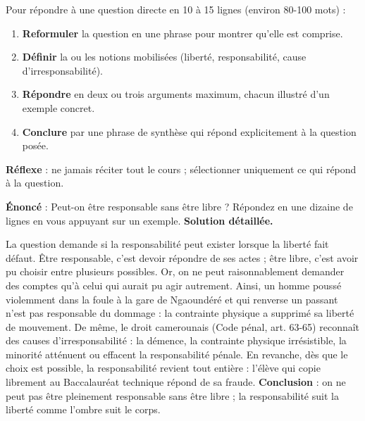\documentclass[11pt]{article}
\begin{document}
\begin{methode}
Pour répondre à une question directe en 10 à 15 lignes (environ 80-100 mots) :
\begin{enumerate}
\item \textbf{Reformuler} la question en une phrase pour montrer qu'elle est comprise.
\item \textbf{Définir} la ou les notions mobilisées (liberté, responsabilité, cause d'irresponsabilité).
\item \textbf{Répondre} en deux ou trois arguments maximum, chacun illustré d'un exemple concret.
\item \textbf{Conclure} par une phrase de synthèse qui répond explicitement à la question posée.
\end{enumerate}
\textbf{Réflexe} : ne jamais réciter tout le cours ; sélectionner uniquement ce qui répond à la question.
\end{methode}

\begin{exoresolu}
\textbf{Énoncé} : Peut-on être responsable sans être libre ? Répondez en une dizaine de lignes en vous appuyant sur un exemple.
\tcblower
\textbf{Solution détaillée.}

La question demande si la responsabilité peut exister lorsque la liberté fait défaut. Être responsable, c'est devoir répondre de ses actes ; être libre, c'est avoir pu choisir entre plusieurs possibles. Or, on ne peut raisonnablement demander des comptes qu'à celui qui aurait pu agir autrement. Ainsi, un homme poussé violemment dans la foule à la gare de Ngaoundéré et qui renverse un passant n'est pas responsable du dommage : la contrainte physique a supprimé sa liberté de mouvement. De même, le droit camerounais (Code pénal, art. 63-65) reconnaît des causes d'irresponsabilité : la démence, la contrainte physique irrésistible, la minorité atténuent ou effacent la responsabilité pénale. En revanche, dès que le choix est possible, la responsabilité revient tout entière : l'élève qui copie librement au Baccalauréat technique répond de sa fraude. \textbf{Conclusion} : on ne peut pas être pleinement responsable sans être libre ; la responsabilité suit la liberté comme l'ombre suit le corps.
\end{exoresolu}
\end{document}
